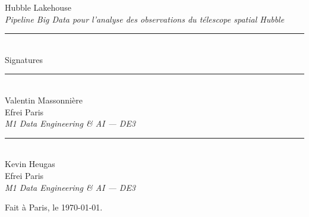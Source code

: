 \documentclass[11pt,a4paper]{article}
\begin{document}
\begin{center}

{\large Hubble Lakehouse}\\[0.2cm]
{\small \textit{Pipeline Big Data pour l'analyse des observations du télescope spatial Hubble}}\\[1.5cm]

\rule{0.5\linewidth}{0.4pt}\\[0.6cm]

{\Large Signatures}\\[2cm]

\begin{minipage}[t]{0.4\linewidth}
\centering
\vspace{3cm}
\rule{\linewidth}{0.4pt}\\[0.3cm]
{\large Valentin Massonnière}\\[0.1cm]
{\small Efrei Paris}\\
{\small \textit{M1 Data Engineering \& AI --- DE3}}
\end{minipage}
\hfill
\begin{minipage}[t]{0.4\linewidth}
\centering
\vspace{3cm}
\rule{\linewidth}{0.4pt}\\[0.3cm]
{\large Kevin Heugas}\\[0.1cm]
{\small Efrei Paris}\\
{\small \textit{M1 Data Engineering \& AI --- DE3}}
\end{minipage}

\vspace{3cm}

{\small Fait à Paris, le \today.}

\end{center}

\vspace*{\fill}
\end{document}

